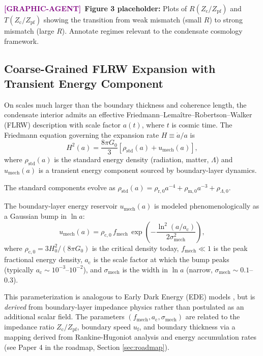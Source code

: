 \documentclass[11pt,a4paper]{article}
\newcommand{\ac}{a_{\mathrm{c}}}
\newcommand{\sigmamech}{\sigma_{\mathrm{mech}}}
\newcommand{\fmech}{f_{\mathrm{mech}}}
\newcommand{\umech}{u_{\mathrm{mech}}}
\newcommand{\rhostd}{\rho_{\mathrm{std}}}
\newcommand{\Zpf}{Z_{\mathrm{pf}}}
\newcommand{\Zcond}{Z_{\mathrm{c}}}
\newcommand{\uf}{u_{\mathrm{f}}}
\theoremstyle{definition}
\newcommand{\GRAPHAGENT}{\textcolor{purple}{\textbf{[GRAPHIC-AGENT]}}}
\begin{document}
\GRAPHAGENT~\textbf{Figure 3 placeholder:} Plots of $R(\Zcond/\Zpf)$ and $T(\Zcond/\Zpf)$ showing the transition from weak mismatch (small $R$) to strong mismatch (large $R$). Annotate regimes relevant to the condensate cosmology framework.

\subsection{Coarse-Grained FLRW Expansion with Transient Energy Component}
\label{sec:FLRW_coarse}

On scales much larger than the boundary thickness and coherence length, the condensate interior admits an effective Friedmann--Lema\^itre--Robertson--Walker (FLRW) description with scale factor $a(t)$, where $t$ is cosmic time. The Friedmann equation governing the expansion rate $H \equiv \dot{a}/a$ is
\begin{equation}
\label{eq:Friedmann_general}
H^2(a) = \frac{8\pi G_0}{3} \left[ \rhostd(a) + \umech(a) \right],
\end{equation}
where $\rhostd(a)$ is the standard energy density (radiation, matter, $\Lambda$) and $\umech(a)$ is a transient energy component sourced by boundary-layer dynamics.

The standard components evolve as $\rhostd(a) = \rho_{\mathrm{r},0} a^{-4} + \rho_{\mathrm{m},0} a^{-3} + \rho_{\Lambda,0}$.

The boundary-layer energy reservoir $\umech(a)$ is modeled phenomenologically as a Gaussian bump in $\ln a$:
\begin{equation}
\label{eq:u_mech}
\umech(a) = \rho_{\mathrm{c},0} \, \fmech \, \exp\!\left( -\frac{\ln^2(a/\ac)}{2\sigmamech^2} \right),
\end{equation}
where $\rho_{\mathrm{c},0} = 3H_0^2/(8\pi G_0)$ is the critical density today, $\fmech \ll 1$ is the peak fractional energy density, $\ac$ is the scale factor at which the bump peaks (typically $\ac \sim 10^{-3}$--$10^{-2}$), and $\sigmamech$ is the width in $\ln a$ (narrow, $\sigmamech \sim 0.1$--$0.3$).

This parameterization is analogous to Early Dark Energy (EDE) models \cite{Poulin2019,EDEReview2023,PoulinReview2023}, but is \emph{derived} from boundary-layer impedance physics rather than postulated as an additional scalar field. The parameters $(\fmech, \ac, \sigmamech)$ are related to the impedance ratio $\Zcond/\Zpf$, boundary speed $\uf$, and boundary thickness via a mapping derived from Rankine-Hugoniot analysis and energy accumulation rates (see Paper 4 in the roadmap, Section \ref{sec:roadmap}).
\end{document}
